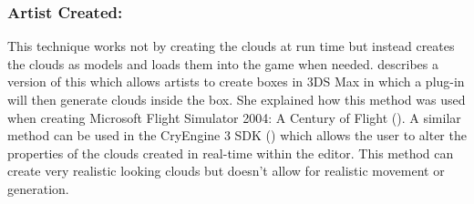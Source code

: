 \subsubsection{Artist Created:}
\label{sec:art}
This technique works not by creating the clouds at run time but instead creates the clouds as models and loads them into the game when needed.
\citet{NWang04} describes a version of this which allows artists to create boxes in 3DS Max in which a plug-in will then generate clouds inside the box.
She explained how this method was used when creating Microsoft Flight Simulator 2004: A Century of Flight (\citeyear{MFS03}).
A similar method can be used in the CryEngine 3 SDK (\citeyear{Crytek13}) which allows the user to alter the properties of the clouds created in real-time within the editor. 
This method can create very realistic looking clouds but doesn't allow for realistic movement or generation.